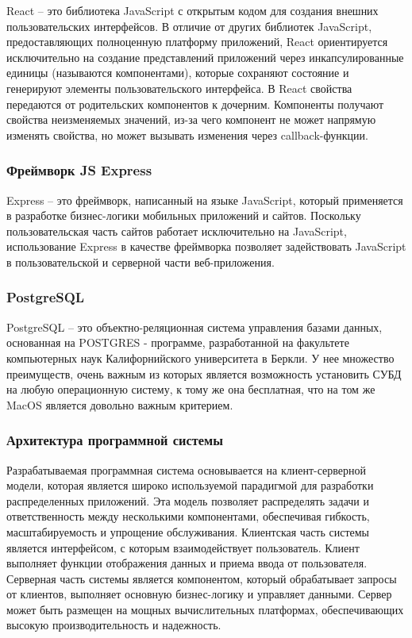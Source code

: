 React -- это библиотека JavaScript с открытым кодом для создания внешних пользовательских интерфейсов. В отличие от других библиотек JavaScript, предоставляющих полноценную платформу приложений, React ориентируется исключительно на создание представлений приложений через инкапсулированные единицы (называются компонентами), которые сохраняют состояние и генерируют элементы пользовательского интерфейса. В React свойства передаются от родительских компонентов к дочерним. Компоненты получают свойства неизменяемых значений, из-за чего компонент не может напрямую изменять свойства, но может вызывать изменения через callback-функции.

\subsubsection{Фреймворк JS Express}

Express -- это фреймворк, написанный на языке JavaScript, который применяется в разработке бизнес-логики мобильных приложений и сайтов. Поскольку пользовательская часть сайтов работает исключительно на JavaScript, использование Express в качестве фреймворка позволяет задействовать JavaScript в пользовательской и серверной части веб-приложения.

\subsubsection{PostgreSQL}

PostgreSQL -- это объектно-реляционная система управления базами данных, основанная на POSTGRES - программе, разработанной на факультете компьютерных наук Калифорнийского университета в Беркли. У нее множество преимуществ, очень важным из которых является возможность установить СУБД на любую операционную систему, к тому же она бесплатная, что на том же MacOS является довольно важным критерием.

\subsubsection{Архитектура программной системы}

Разрабатываемая программная система основывается на клиент-серверной модели, которая является широко используемой парадигмой для разработки распределенных приложений. Эта модель позволяет распределять задачи и ответственность между несколькими компонентами, обеспечивая гибкость, масштабируемость и упрощение обслуживания. Клиентская часть системы является интерфейсом, с которым взаимодействует пользователь. Клиент выполняет функции отображения данных и приема ввода от пользователя. Серверная часть системы является компонентом, который обрабатывает запросы от клиентов, выполняет основную бизнес-логику и управляет данными. Сервер может быть размещен на мощных вычислительных платформах, обеспечивающих высокую производительность и надежность.

